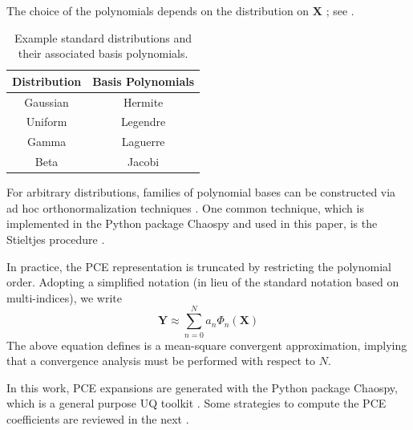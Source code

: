 \documentclass[preprint,review,12pt]{elsarticle}
\begin{document}
The choice of the polynomials depends on the distribution on $\mathbf{X}$ \citep{Xiu-2002,Soize-2004}; see .
\begin{table}[H]
    \caption{Example standard distributions and their associated basis polynomials.}
    \centering
    \begin{tabular}{cc} 
        \toprule
        Distribution & Basis Polynomials \\
        \midrule        
        Gaussian & Hermite \\
        Uniform & Legendre \\
        Gamma & Laguerre \\
        Beta & Jacobi \\
        \bottomrule
    \end{tabular}
    \label{tab:dist_PCE}
\end{table}
For arbitrary distributions, families of polynomial bases can be constructed via ad hoc orthonormalization techniques \citep{Perrin2012}. One common technique, which is implemented in the Python package Chaospy \citep{FEINBERG201546} and used in this paper, is the Stieltjes procedure \citep{stieltjes1884quelques}.

In practice, the PCE representation is truncated by restricting the polynomial order. Adopting a simplified notation (in lieu of the standard notation based on multi-indices), we write 
\begin{equation}
    \mathbf{Y} \approx \sum_{n=0}^{N} a_n \Phi_n(\mathbf{X})
\end{equation}
The above equation defines is a mean-square convergent approximation, implying that a convergence analysis must be performed with respect to $N$.

In this work, PCE expansions are generated with the Python package Chaospy, which is a general purpose UQ toolkit \citep{FEINBERG201546}. Some strategies to compute the PCE coefficients are reviewed in the next .
\end{document}
